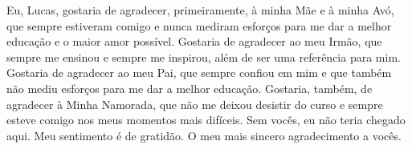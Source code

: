 \begin{agradecimentos}
Eu, Lucas, gostaria de agradecer, primeiramente, à minha Mãe e à minha Avó, que sempre estiveram comigo e nunca mediram esforços para me dar a melhor educação e o maior amor possível. Gostaria de agradecer ao meu Irmão, que sempre me ensinou e sempre me inspirou, além de ser uma referência para mim. Gostaria de agradecer ao meu Pai, que sempre confiou em mim e que também não mediu esforços para me dar a melhor educação. Gostaria, também, de agradecer à Minha Namorada, que não me deixou desistir do curso e sempre esteve comigo nos meus momentos mais difíceis. Sem vocês, eu não teria chegado aqui. Meu sentimento é de gratidão. O meu mais sincero agradecimento a vocês.

\end{agradecimentos}
